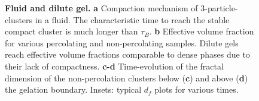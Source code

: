 \begin{figure}
	\caption{\textbf{Fluid and dilute gel.} \textbf{a} Compaction mechanism of 3-particle-clusters in a fluid. The characteristic time to reach the stable compact cluster is much longer than $\tau_B$. \textbf{b} Effective volume fraction for various percolating and non-percolating samples. Dilute gels reach effective volume fractions comparable to dense phases due to their lack of compactness. \textbf{c-d} Time-evolution of the fractal dimension of the non-percolation clusters below (\textbf{c}) and above (\textbf{d}) the gelation boundary. Insets: typical $d_f$ plots for various times.}
	\label{fig:fluid_dilute}
\end{figure}

